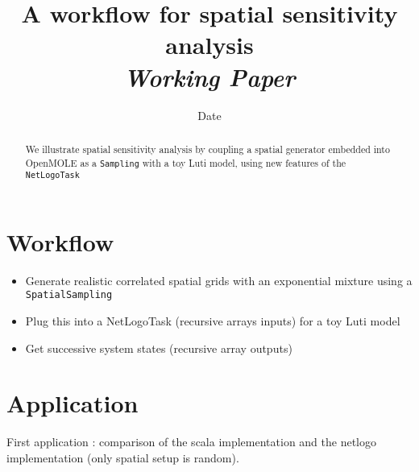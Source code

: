 


\title{A workflow for spatial sensitivity analysis\bigskip\\
\textit{Working Paper}
}
\author{}
\date{Date}


\maketitle

\justify


\begin{abstract}
We illustrate spatial sensitivity analysis by coupling a spatial generator embedded into OpenMOLE as a \texttt{Sampling} with a toy Luti model, using new features of the \texttt{NetLogoTask}
\end{abstract}


\section*{Workflow}

\begin{itemize}
	\item Generate realistic correlated spatial grids with an exponential mixture using a \texttt{SpatialSampling}
	\item Plug this into a NetLogoTask (recursive arrays inputs) for a toy Luti model
	\item Get successive system states (recursive array outputs)
\end{itemize}


\section*{Application}

First application : comparison of the scala implementation and the netlogo implementation (only spatial setup is random).













